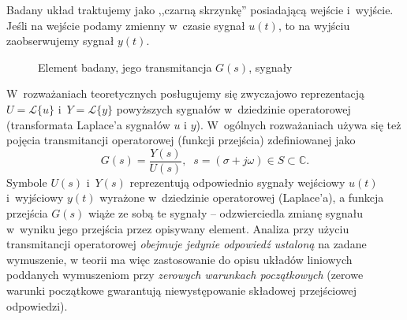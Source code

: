 \documentclass[paper=a4,DIV=12]{lpas}
\begin{document}
\begin{appendices}
  Badany układ traktujemy jako ,,czarną skrzynkę'' posiadającą wejście i~wyjście.
  Jeśli na wejście podamy zmien\-ny w~czasie sygnał $u(t)$, to na wyjściu
  zaobserwujemy sygnał $y(t)$.
  \begin{figure}[htbp]
    \centering
    \caption{Element badany, jego transmitancja $G(s)$, sygnały}
    \label{fig:6TEOB}
  \end{figure}
  W~rozważaniach teoretycznych posługujemy się zwyczajowo reprezentacją
  $U = \mathscr{L}\{u\}$ i~$Y = \mathscr{L}\{y\}$ powyższych sygnałów
  w~dziedzinie operatorowej (transformata Laplace'a sygnałów $u$ i $y$).
  W~ogólnych rozważaniach używa się też pojęcia transmitancji operatorowej
  (funkcji przejścia) zdefiniowanej jako
  \begin{equation}
    G\left(s\right) = \frac{Y(s)}{U(s)}, \;\;
    s = \left( \sigma + j \omega \right) \in S \subset \mathbb{C}.
    \label{eq:34IJQ}
  \end{equation}
  Symbole $U\left(s\right)$ i~$Y\left(s\right)$ reprezentują odpowiednio sygnały
  wejściowy $u(t)$ i~wyjściowy $y(t)$ wyrażone w~dziedzinie
  operatorowej (Laplace'a), a funkcja przejścia $G(s)$ wiąże ze sobą te sygnały --
  odzwierciedla zmianę sygnału w~wyniku jego przejścia przez opisywany element.
  Analiza przy użyciu transmitancji operatorowej {\em obejmuje jedynie odpowiedź
  ustaloną} na zadane wymuszenie, w teorii ma więc zastosowanie do opisu układów
  liniowych poddanych wymuszeniom przy {\em zerowych warunkach początkowych}
  (zerowe warunki początkowe gwarantują niewystępowanie składowej przejściowej
  odpowiedzi).


\end{appendices}
\end{document}
